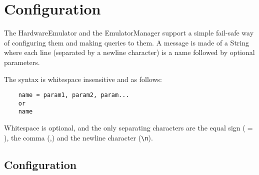 \setlength{\voffset}{-1in}
\setlength{\hoffset}{-1in}

\setlength{\topmargin}{2.5cm}		   
\setlength{\headheight}{0cm}		   
\setlength{\headsep}{0cm}		   
\setlength{\oddsidemargin}{3,3cm}  %
\setlength{\evensidemargin}{2,7cm} %
\setlength{\textwidth}{15cm}		   
\setlength{\textheight}{23,5cm}		   
\setlength{\parindent}{0cm}

\newcommand{\emptyLine}{{\LARGE ~\\}}


\setcounter{page}{1}


\section{Configuration}
\label{emuconfig}

The HardwareEmulator and the EmulatorManager support a simple fail-safe way of configuring them and making queries to them. A message is made of a String where each line (separated by a newline character) is a name followed by optional parameters.

The syntax is whitespace insensitive and as follows:
\begin{verbatim}
    name = param1, param2, param...
    or
    name
\end{verbatim}
Whitespace is optional, and the only separating characters are the equal sign ($=$), the comma (,) and the newline character (\texttt{\textbackslash n}).

\subsection{Configuration}

